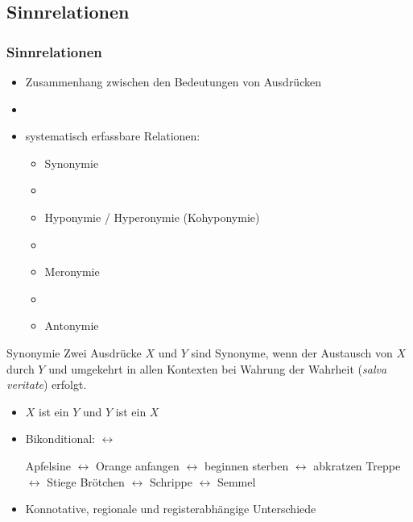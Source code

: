 %
\subsection{Sinnrelationen}
%

\begin{frame}
\frametitle{Sinnrelationen}

\begin{itemize}
	\item Zusammenhang zwischen den Bedeutungen von Ausdrücken
	\item[]
	\item systematisch erfassbare Relationen:
	
\vspace{5mm}
	
	\begin{itemize}
		\item Synonymie
		\item[]
		\item Hyponymie / Hyperonymie (Kohyponymie)
		\item[]		
		\item Meronymie
		\item[]
 		\item Antonymie
	\end{itemize}
	
\end{itemize}

\end{frame}



\begin{frame}

\begin{block}{Synonymie}
Zwei Ausdrücke $X$ und $Y$ sind Synonyme, wenn der Austausch von $X$ durch $Y$ und umgekehrt in allen Kontexten bei Wahrung der Wahrheit (\emph{salva veritate}) erfolgt.
\end{block}

\begin{itemize}
	\item $X$ ist ein $Y$ und $Y$ ist ein $X$
	\item Bikonditional: $\leftrightarrow$
	
	\eal
		\ex Apfelsine $\leftrightarrow$ Orange
		\ex anfangen $\leftrightarrow$ beginnen
		\ex sterben $\leftrightarrow$ abkratzen
		\ex Treppe $\leftrightarrow$ Stiege
		\ex Brötchen $\leftrightarrow$ Schrippe $\leftrightarrow$ Semmel
	\zl
	
	\item Konnotative, regionale und registerabhängige Unterschiede
\end{itemize}

\end{frame}


